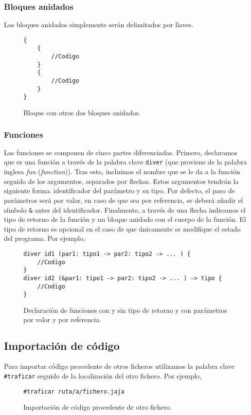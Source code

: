 \subsubsection*{Bloques anidados}
Los bloques anidados simplemente serán delimitados por llaves.
\begin{figure}[H]
    \centering
    \begin{lstlisting}
{
    {
        //Codigo
    }
    {
        //Codigo
    }
}
    \end{lstlisting}
    \caption{Bloque con otros dos bloques anidados.}
\end{figure}

\subsubsection*{Funciones}
Las funciones se componen de cinco partes diferenciadas. Primero, declaramos que
es una función a través de la palabra clave \lstinline{diver} (que proviene de la palabra
inglesa \textit{fun} (\textit{function})). Tras esto, incluimos el nombre que se
le da a la función seguido de los argumentos, separados por flechas. Estos
argumentos tendrán la siguiente forma: identificador del parámetro y su tipo.
Por defecto, el paso de parámetros será por valor, en caso de que sea por
referencia, se deberá añadir el símbolo \lstinline{&} antes del identificador.
Finalmente, a través de una flecha indicamos el tipo de retorno de la función y
un bloque anidado con el cuerpo de la función. El tipo de retorno es opcional en
el caso de que únicamente se modifique el estado del programa. Por ejemplo,
\begin{figure}[H]
    \centering
    \begin{lstlisting}
diver id1 (par1: tipo1 -> par2: tipo2 -> ... ) {
    //Codigo
}
diver id2 (&par1: tipo1 -> par2: tipo2 -> ... ) -> tipo {
    //Codigo
}
    \end{lstlisting}
    \caption{Declaración de funciones con y sin tipo de retorno y con parámetros
    por valor y por referencia.}
\end{figure}

\subsection*{Importación de código}
Para importar código procedente de otros ficheros utilizamos la palabra clave
\lstinline{#traficar} seguido de la localización del otro fichero. Por ejemplo,
\begin{figure}[H]
    \centering
    \begin{lstlisting}
#traficar ruta/a/fichero.jaja
    \end{lstlisting}
    \caption{Importación de código procedente de otro fichero.}
\end{figure}

